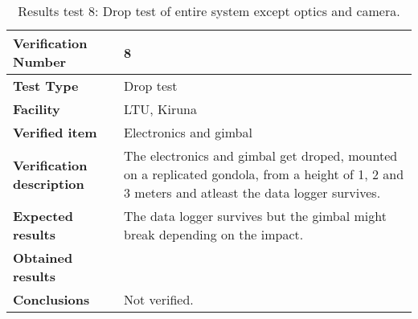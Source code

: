 \begin{table}[H]
\centering

\begin{tabular}{|m{}| m{} |}
\hline
\textbf{Verification Number} 		& 8 				\\ \hline
\textbf{Test Type} 					& Drop test			\\ \hline
\textbf{Facility} 					& LTU, Kiruna 		\\ \hline
\textbf{Verified item} 				& Electronics and gimbal \\ \hline

\textbf{Verification description} 	& The electronics and gimbal get droped, mounted on a replicated gondola, from a height of 1, 2 and 3 meters and atleast the data logger survives. \\ \hline

\textbf{Expected results} 			& The data logger survives but the gimbal might break depending on the impact. \\ \hline

\textbf{Obtained results} 			& \\ \hline

\textbf{Conclusions} 				& Not verified.		\\ \hline
\end{tabular}
\caption{Results test 8: Drop test of entire system except optics and camera.}
\label{tab:testresult8:droptest}
\end{table}


\raggedbottom